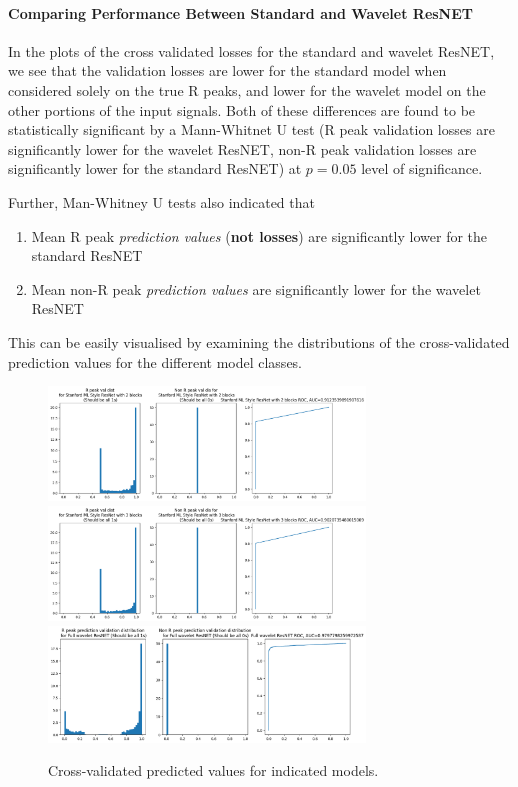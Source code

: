 \documentclass[9pt,conference]{IEEEtran}
\begin{document}
\paragraph{\textbf{Comparing Performance Between Standard and Wavelet ResNET}}
In the plots of the cross validated losses for the standard and wavelet ResNET, we see that the validation losses are lower for the standard model when considered solely on the true R peaks, and lower for the wavelet model on the other portions of the input signals. Both of these differences are found to be statistically significant by a Mann-Whitnet U test (R peak validation losses are significantly lower for the wavelet ResNET, non-R peak validation losses are significantly lower for the standard ResNET) at $p=0.05$ level of significance.

Further, Man-Whitney U tests also indicated that 

\begin{enumerate}
    \item Mean R peak \textit{prediction values} (\textbf{not losses}) are significantly lower for the standard ResNET
    \item Mean non-R peak \textit{prediction values} are significantly lower for the wavelet ResNET
\end{enumerate} 

This can be easily visualised by examining the distributions of the cross-validated prediction values for the different model classes.

\begin{figure}[H]
    \centering
    \includegraphics[width=0.75\textwidth]{resnet2Dist.png}
    \includegraphics[width=0.75\textwidth]{resnet3Dist.png}
    \includegraphics[width=0.75\textwidth]{waveletNetDist.png}
    \caption{Cross-validated predicted values for indicated models.}
\end{figure}
\end{document}
